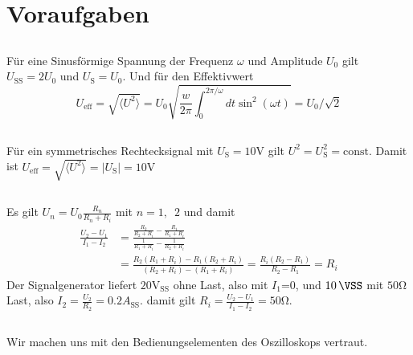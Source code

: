 \documentclass{article}
\newcommand{\subsectionAlph}{ \renewcommand{\thesubsection}{\arabic{section}.\Alph{subsection}} }
\begin{document}
\section{Voraufgaben}
\begingroup
\subsectionAlph
\subsection{}
Für eine Sinusförmige Spannung der Frequenz $\omega$ und Amplitude $U_0$ gilt $U_\text{SS} = 2U_0$ und $U_\text{S} = U_0$.
Und für den Effektivwert
\begin{equation}
  U_\text{eff} = \sqrt{\langle U^2 \rangle} = U_0 \sqrt{\frac{w}{2\pi} \int_0^{2\pi/\omega} dt \sin^2(\omega t)} = U_0/\sqrt{2}
\end{equation}

\subsection{}
Für ein symmetrisches Rechtecksignal mit $U_\text{S} = 10\text{V}$ gilt $U^2 = U_\text{S}^2 = \text{const.}$
Damit ist $U_\text{eff} = \sqrt{\langle U^2 \rangle} = \lvert U_\text{S} \rvert = 10\text{V}$

\subsection{}
Es gilt $U_n = U_0 \frac{R_n}{R_n+R_i}$ mit $n=1,\enspace 2$ und damit
\begin{align}
  \frac{U_2 - U_1}{I_1 - I_2} &= \frac{ \frac{R_2}{R_2+R_i} - \frac{R_1}{R_1+R_i}}{ \frac{1}{R_1+R_i} - \frac{1}{R_2+R_i} } \nonumber \\ 
  &= \frac{ R_2(R_1+R_i) - R_1(R_2+R_i) }{ (R_2+R_i) - (R_1+R_i) } = \frac{R_i(R_2-R_1)}{R_2-R_1} = R_i
\end{align}
Der Signalgenerator liefert $20\text{V}_\text{SS}$ ohne Last, also mit $I_1$=0, und $\SI{10}{\VSS}$ mit $50\mathrm{\Omega}$ Last,
also $I_2 = \frac{U_2}{R_2} = 0.2A_\text{SS}$. damit gilt $R_i = \frac{U_2 - U_1}{I_1 - I_2} = 50\mathrm{\Omega}$.

\subsection{}
Wir machen uns mit den Bedienungselementen des Oszilloskops vertraut.
\end{document}
